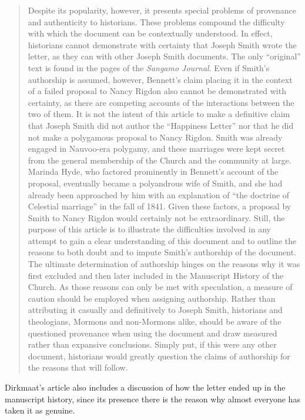 				\begin{quote}
					Despite its popularity, however, it presents special problems of provenance and authenticity to historians. These problems compound the difficulty with which the document can be contextually understood. In effect, historians cannot demonstrate with certainty that Joseph Smith wrote the letter, as they can with other Joseph Smith documents. The only ``original'' text is found in the pages of the \textit{Sangamo Journal}. Even if Smith’s authorship is assumed, however, Bennett’s claim placing it in the context of a failed proposal to Nancy Rigdon also cannot be demonstrated with certainty, as there are competing accounts of the interactions between the two of them. It is not the intent of this article to make a definitive claim that Joseph Smith did not author the ``Happiness Letter'' nor that he did not make a polygamous proposal to Nancy Rigdon. Smith was already engaged in Nauvoo-era polygamy, and these marriages were kept secret from the general membership of the Church and the community at large. Marinda Hyde, who factored prominently in Bennett’s account of the proposal, eventually became a polyandrous wife of Smith, and she had already been approached by him with an explanation of ``the doctrine of Celestial marriage'' in the fall of 1841. Given these factors, a proposal by Smith to Nancy Rigdon would certainly not be extraordinary. Still, the purpose of this article is to illustrate the difficulties involved in any attempt to gain a clear understanding of this document and to outline the reasons to both doubt and to impute Smith’s authorship of the document. The ultimate determination of authorship hinges on the reasons why it was first excluded and then later included in the Manuscript History of the Church. As those reasons can only be met with speculation, a measure of caution should be employed when assigning authorship. Rather than attributing it casually and definitively to Joseph Smith, historians and theologians, Mormons and non-Mormons alike, should be aware of the questioned provenance when using the document and draw measured rather than expansive conclusions. Simply put, if this were any other document, historians would greatly question the claims of authorship for the reasons that will follow. 
				\end{quote}
				
				\noindent Dirkmaat's article also includes a discussion of how the letter ended up in the manuscript history, since its presence there is the reason why almost everyone has taken it as genuine.
				
